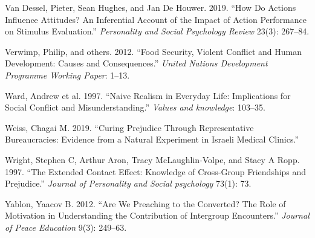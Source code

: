 \documentclass[11pt]{article}
\begin{document}
\leavevmode\hypertarget{ref-van2019actions}{}%
Van Dessel, Pieter, Sean Hughes, and Jan De Houwer. 2019. ``How Do
Actions Influence Attitudes? An Inferential Account of the Impact of
Action Performance on Stimulus Evaluation.'' \emph{Personality and
Social Psychology Review} 23(3): 267--84.

\leavevmode\hypertarget{ref-verwimp2012food}{}%
Verwimp, Philip, and others. 2012. ``Food Security, Violent Conflict and
Human Development: Causes and Consequences.'' \emph{United Nations
Development Programme Working Paper}: 1--13.

\leavevmode\hypertarget{ref-ward1997naive}{}%
Ward, Andrew et al. 1997. ``Naive Realism in Everyday Life: Implications
for Social Conflict and Misunderstanding.'' \emph{Values and knowledge}:
103--35.

\leavevmode\hypertarget{ref-weiss2019curing}{}%
Weiss, Chagai M. 2019. ``Curing Prejudice Through Representative
Bureaucracies: Evidence from a Natural Experiment in Israeli Medical
Clinics.''

\leavevmode\hypertarget{ref-wright1997extended}{}%
Wright, Stephen C, Arthur Aron, Tracy McLaughlin-Volpe, and Stacy A
Ropp. 1997. ``The Extended Contact Effect: Knowledge of Cross-Group
Friendships and Prejudice.'' \emph{Journal of Personality and Social
psychology} 73(1): 73.

\leavevmode\hypertarget{ref-yablon2012we}{}%
Yablon, Yaacov B. 2012. ``Are We Preaching to the Converted? The Role of
Motivation in Understanding the Contribution of Intergroup Encounters.''
\emph{Journal of Peace Education} 9(3): 249--63.
\end{document}
